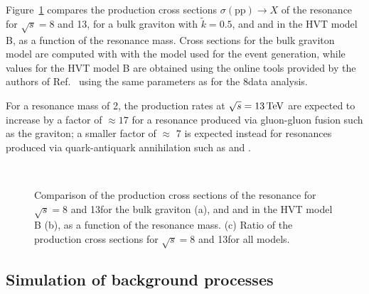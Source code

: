 Figure~\ref{fig:allmodelsXsec} compares the production cross sections $\sigma(\mathrm{pp}) \to X$ of the resonance for $\sqrt{s} = 8$ and 13\TeV,
for a bulk graviton with $\tilde{k} = 0.5$, and \Wpr and \Zpr in the HVT model B, as a function of the resonance mass.
Cross sections for the bulk graviton model are computed with \MADGRAPH{} with the model used for the event generation,
while values for the HVT model B are obtained using the online tools provided by the authors of Ref.~\cite{Pappadopulo:2014qza}
using the same parameters as for the 8\TeV data analysis.

For a resonance mass of 2\TeV, the production rates at $\sqrt{s} = 13\,\text{Te\hspace{-.08em}V}$ are expected to increase by a factor of $\approx 17$
for a resonance produced via gluon-gluon fusion such as the graviton; a smaller factor of $\approx$ 7 is expected instead
for resonances produced via quark-antiquark annihilation such as \Wpr and \Zpr.

\begin{figure}[!htb]
\centering
{}
\\
\caption{Comparison of the production cross sections of the resonance for $\sqrt{s} = 8$ and 13\TeV for the bulk graviton (a), and \Wpr and \Zpr in the HVT model B (b), as a function of the resonance mass.
(c) Ratio of the production cross sections for $\sqrt{s} = 8$ and 13\TeV for all models.}
\label{fig:allmodelsXsec}
\end{figure}

\subsection{Simulation of background processes}\label{subsec:bkgMC}

